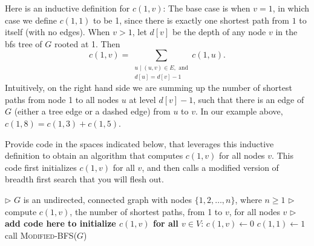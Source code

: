 \documentclass[11pt,fleqn]{exam}
\newenvironment{soln}{\color{solnblue}}{}
\newif\ifsolutions\solutionsfalse
\begin{document}
\begin{questions}
\ifsolutions
\clearpage
\fi

\question[4]
\label{counting-alg}
Here is an inductive definition for $c(1,v)$: The base case is when $v=1$, in which case we define $c(1,1)$ to be 1, since there is exactly one shortest path from $1$ to itself (with no edges). When $v > 1$, let $d[v]$ be the depth of any node $v$ in the bfs tree of $G$ rooted at 1. Then
\[
c(1,v) = \sum_{\begin{array}{l}u \;|\; (u,v) \in E, \mbox{ and} \\ d[u] = d[v] - 1\end{array}} c(1,u).
\]
Intuitively, on the right hand side we are summing up the number of shortest paths from node 1 to all nodes $u$ at level $d[v]-1$, such that there is an edge of $G$ (either a tree edge or a dashed edge) from $u$ to $v$. In our example above, $c(1,8) = c(1,3) + c(1,5)$.

Provide code in the spaces indicated below, that leverages this inductive definition to obtain an algorithm that computes $c(1,v)$ for all nodes $v$. This code first initializes $c(1,v)$ for all $v$, and then calls a modified version of breadth first search that you will flesh out.

\vspace{,1in}

\ifsolutions

\else
\begin{algorithmic}
    \State $\triangleright$ $G$ is an undirected, connected graph with nodes $\{1,2,\ldots,n\}$, where $n \ge 1$
    \State $\triangleright$ compute $c(1,v)$, the number of shortest paths, from 1 to $v$, for all nodes $v$
     \State $\triangleright$ {\bf add code here to initialize $c(1,v)$ for all $v \in V$}:
      \begin{soln}
         \State \(c(1,v) \gets 0\)
      \EndFor
      \State \(c(1,1) \gets 1\)  
      \end{soln}
      \State call \textsc{Modified-BFS}($G$)
\EndProcedure
\end{algorithmic}

\vspace{.1in}


\end{questions}
\end{document}
